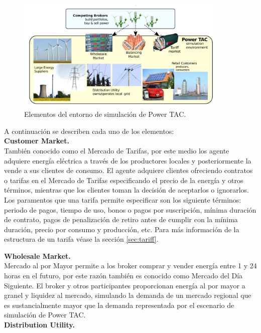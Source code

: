 \begin{figure}[!h]
	\centering
	\includegraphics[width=10cm]{img/entorno.png}
	\caption{Elementos del entorno de simulación de Power TAC.}
	\label{entorno}
\end{figure}

A continuación se describen cada uno de los elementos:\\

\textbf{Customer Market.}\\

También conocido como el  Mercado de Tarifas, por este medio los agente adquiere energía eléctrica a través de los productores locales y posteriormente la vende a sus clientes de consumo. El agente adquiere clientes ofreciendo contratos o tarifas en el Mercado de Tarifas especificando el precio de la energía y otros términos, mientras que los clientes toman la decisión de aceptarlos o ignorarlos. 
Los paramentos que una tarifa permite especificar son los siguiente términos: periodo de pagos, tiempo de uso, bonos o pagos por suscripción, mínima duración de contrato, pagos de penalización de retiro antes de cumplir con la mínima duración, precio por consumo y producción, etc. Para más información  de la estructura de un tarifa véase la sección \ref{sec:tariff}.

\textbf{Wholesale Market.}\\

Mercado al por Mayor permite a los broker comprar y vender energía entre 1 y 24 horas en el futuro, por este razón también es conocido como Mercado del Día Siguiente. El broker y otros participantes proporcionan energía al por mayor a granel y liquidez al mercado, simulando la demanda de un mercado regional que es sustancialmente mayor que la demanda representada por el escenario de simulación de Power TAC.\\

\textbf{Distribution Utility.}\\

